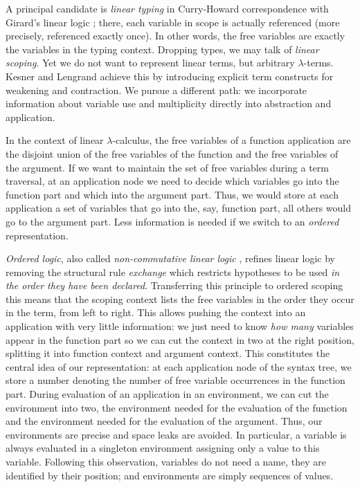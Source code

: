 \documentclass[submission,copyright,creativecommons]{eptcs}
\begin{document}
A principal candidate is \emph{linear typing} in Curry-Howard
correspondence with Girard's linear logic \cite{girard:linear}; there,
each variable in scope is actually referenced (more precisely,
referenced exactly once).  In other words, the
free variables are exactly the variables in the typing context.
Dropping types, we may talk of \emph{linear scoping}.
Yet we do not want to represent linear terms, but arbitrary
$\lambda$-terms.   Kesner and Lengrand \cite{kesnerLengrand:infcomp07}
achieve this by introducing explicit term constructs for weakening and
contraction.  We pursue a different path: we incorporate information
about variable use and multiplicity directly into abstraction and
application. 

In the context of linear $\lambda$-calculus, the free
variables of a function application are the disjoint union of the free
variables of the function and the free variables of the argument.  If
we want to maintain the set of free variables during a term traversal,
at an application node we need to decide which variables go into the
function part and which into the argument part.  Thus, we would store
at each application a set of variables that go into the, say, function
part, all others would go to the argument part.  Less information is
needed if we switch to an \emph{ordered} representation.

\emph{Ordered logic}, also called \emph{non-commutative linear logic}
\cite{polakowPfenning:tlca99}, refines linear logic by removing the
structural rule \emph{exchange} which restricts hypotheses to be used
\emph{in the order they have been declared}.  Transferring this
principle to ordered scoping this means that the scoping context lists
the free variables in the order they occur in the term, from left to
right.  This allows pushing the context into an application with very
little information: we just need to know \emph{how many} variables
appear in the function part so we can cut the context in two at the
right position, splitting it into function context and argument
context.  This constitutes the central idea of our representation: at
each application node of the syntax tree, we store a number denoting
the number of free variable occurrences in the function part.  During
evaluation of an application in an environment, we can cut the
environment into two, the environment needed for the evaluation of the
function and the environment needed for the evaluation of the
argument.  Thus, our environments are precise and space leaks are
avoided.  In particular, a variable is always evaluated in a singleton
environment assigning only a value to this variable.  Following this
observation, variables do not need a name, they are identified by
their position; and environments are simply sequences of values.
\end{document}
